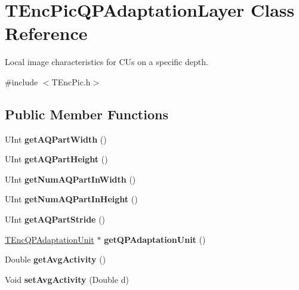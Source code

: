 \hypertarget{class_t_enc_pic_q_p_adaptation_layer}{}\section{T\+Enc\+Pic\+Q\+P\+Adaptation\+Layer Class Reference}
\label{class_t_enc_pic_q_p_adaptation_layer}


Local image characteristics for C\+Us on a specific depth.  




{\ttfamily \#include $<$T\+Enc\+Pic.\+h$>$}

\subsection*{Public Member Functions}
\begin{DoxyCompactItemize}
\item 
\mbox{\label{class_t_enc_pic_q_p_adaptation_layer_aab6e68b13cc88eafe2fb5fd5805ae560}} 
U\+Int {\bfseries get\+A\+Q\+Part\+Width} ()
\item 
\mbox{\label{class_t_enc_pic_q_p_adaptation_layer_acc170d5d2750029ddb4657238242bee0}} 
U\+Int {\bfseries get\+A\+Q\+Part\+Height} ()
\item 
\mbox{\label{class_t_enc_pic_q_p_adaptation_layer_a4db6a7fa734240266d352a7308669296}} 
U\+Int {\bfseries get\+Num\+A\+Q\+Part\+In\+Width} ()
\item 
\mbox{\label{class_t_enc_pic_q_p_adaptation_layer_a4cf66f5b67a3f87ef8e6b0c473c7612a}} 
U\+Int {\bfseries get\+Num\+A\+Q\+Part\+In\+Height} ()
\item 
\mbox{\label{class_t_enc_pic_q_p_adaptation_layer_a21fa1f70be45d9f4e8eb9c0083bbd974}} 
U\+Int {\bfseries get\+A\+Q\+Part\+Stride} ()
\item 
\mbox{\label{class_t_enc_pic_q_p_adaptation_layer_a204c568d07e08fa09216ef963e3f06cb}} 
\hyperlink{class_t_enc_q_p_adaptation_unit}{T\+Enc\+Q\+P\+Adaptation\+Unit} $\ast$ {\bfseries get\+Q\+P\+Adaptation\+Unit} ()
\item 
\mbox{\label{class_t_enc_pic_q_p_adaptation_layer_a479dde12d8163b40a35130824eb46c37}} 
Double {\bfseries get\+Avg\+Activity} ()
\item 
\mbox{\label{class_t_enc_pic_q_p_adaptation_layer_acec1e8fc2118970a044ed7a0699ff385}} 
Void {\bfseries set\+Avg\+Activity} (Double d)
\end{DoxyCompactItemize}

